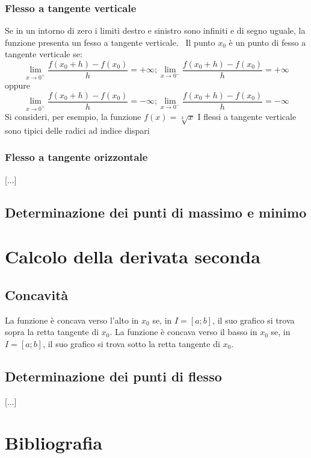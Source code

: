 \documentclass[a4paper,14pt]{extarticle}
\begin{document}
\subsubsection{Flesso a tangente verticale}
Se in un intorno di zero i limiti destro e sinistro sono infiniti e di segno uguale, la funzione presenta un fesso a tangente verticale. \ Il punto $x_0$ è un punto di fesso a tangente verticale se:
$$\lim_{x\to0^+} \frac{f(x_0 + h) - f(x_0)}{h} = +\infty ; \lim_{x\to0^-} \frac{f(x_0 + h) - f(x_0)}{h} = +\infty$$
oppure \\
$$\lim_{x\to0^+} \frac{f(x_0 + h) - f(x_0)}{h} = -\infty ; \lim_{x\to0^-} \frac{f(x_0 + h) - f(x_0)}{h} = -\infty$$
Si consideri, per esempio, la funzione $f(x) = \sqrt[3]{x}$ \newline I flessi a tangente verticale sono tipici delle radici ad indice dispari

\subsubsection{Flesso a tangente orizzontale}
[...]

\subsection{Determinazione dei punti di massimo e minimo}

\section{Calcolo della derivata seconda}
\subsection{Concavità}
La funzione è concava verso l'alto in $x_0$ se, in $I = [a; b]$, il suo grafico si trova sopra la retta tangente di $x_0$. La funzione è concava verso il basso in $x_0$ se, in $I = [a; b]$, il suo grafico si trova sotto la retta tangente di $x_0$.
\subsection{Determinazione dei punti di flesso}
[...]

\section{Bibliografia}
\end{document}
